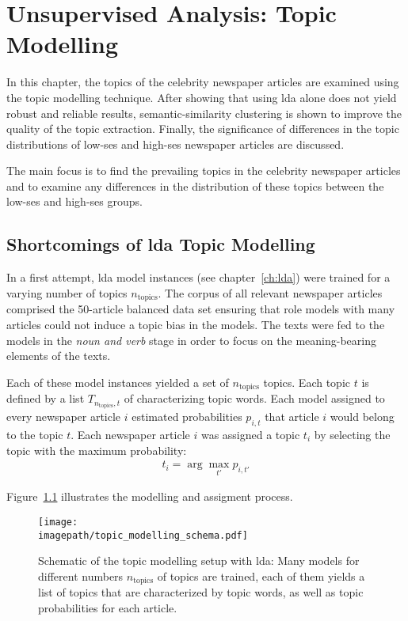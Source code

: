\renewcommand{\imagepath}{../50-unsupervised/img}
\newcommand{\ntopics}{n_\text{topics}}

\chapter{Unsupervised Analysis: Topic Modelling}
In this chapter, the topics of the celebrity newspaper articles are examined using the topic modelling technique. After showing that using \gls{lda} alone does not yield robust and reliable results, semantic-similarity clustering is shown to improve the quality of the topic extraction.  Finally, the significance of differences in the topic distributions of low-\gls{ses} and high-\gls{ses} newspaper articles are discussed.

The main focus is to find the prevailing topics in the celebrity newspaper articles and to examine any differences in the distribution of these topics between the low-\gls{ses} and high-\gls{ses} groups.

\section{Shortcomings of \gls{lda} Topic Modelling}
In a first attempt, \gls{lda} model instances (see chapter~\ref{ch:lda}) were trained for a varying number of topics $\ntopics$. The corpus of all relevant newspaper articles comprised the 50-article balanced data set ensuring that role models with many articles could not induce a topic bias in the models. The texts were fed to the models in the \textit{noun and verb} stage in order to focus on the meaning-bearing elements of the texts.

Each of these model instances yielded a set of $\ntopics$ topics. Each topic $t$ is defined by a list $T_{\ntopics, t}$ of characterizing topic words. Each model assigned to every newspaper article $i$ estimated probabilities $p_{i, t}$ that article $i$ would belong to the topic $t$. Each newspaper article $i$ was assigned a topic $t_i$ by selecting the topic with the maximum probability:
\begin{align}
    t_i = \arg \max_{t'} p_{i, t'}
\end{align}

Figure~\ref{fig:topic_modelling_schema} illustrates the modelling and assigment process.
\begin{figure}
    \centering
    \texttt{[image: \\imagepath/topic\_modelling\_schema.pdf]}
    \caption{Schematic of the topic modelling setup with \gls{lda}: Many models for different numbers $\ntopics$ of topics are trained, each of them yields a list of topics that are characterized by topic words, as well as topic probabilities for each article.}\label{fig:topic_modelling_schema}
\end{figure}


